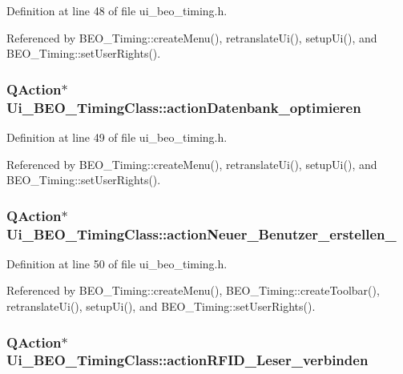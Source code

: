 Definition at line 48 of file ui\_\-beo\_\-timing.h.

Referenced by BEO\_\-Timing::createMenu(), retranslateUi(), setupUi(), and BEO\_\-Timing::setUserRights().\hypertarget{class_ui___b_e_o___timing_class_50b0c772b8508d73aa04cc938b6dd80e}{
\subsubsection[actionDatenbank\_\-optimieren]{\setlength{\rightskip}{0pt plus 5cm}QAction$\ast$ {\bf Ui\_\-BEO\_\-TimingClass::actionDatenbank\_\-optimieren}}}
\label{class_ui___b_e_o___timing_class_50b0c772b8508d73aa04cc938b6dd80e}




Definition at line 49 of file ui\_\-beo\_\-timing.h.

Referenced by BEO\_\-Timing::createMenu(), retranslateUi(), setupUi(), and BEO\_\-Timing::setUserRights().\hypertarget{class_ui___b_e_o___timing_class_687853281c5ba234eab8737392a620a0}{
\subsubsection[actionNeuer\_\-Benutzer\_\-erstellen\_\-3]{\setlength{\rightskip}{0pt plus 5cm}QAction$\ast$ {\bf Ui\_\-BEO\_\-TimingClass::actionNeuer\_\-Benutzer\_\-erstellen\_}}}
\label{class_ui___b_e_o___timing_class_687853281c5ba234eab8737392a620a0}




Definition at line 50 of file ui\_\-beo\_\-timing.h.

Referenced by BEO\_\-Timing::createMenu(), BEO\_\-Timing::createToolbar(), retranslateUi(), setupUi(), and BEO\_\-Timing::setUserRights().\hypertarget{class_ui___b_e_o___timing_class_f79465573d96a63961f3c088b29b3084}{
\subsubsection[actionRFID\_\-Leser\_\-verbinden]{\setlength{\rightskip}{0pt plus 5cm}QAction$\ast$ {\bf Ui\_\-BEO\_\-TimingClass::actionRFID\_\-Leser\_\-verbinden}}}
\label{class_ui___b_e_o___timing_class_f79465573d96a63961f3c088b29b3084}




